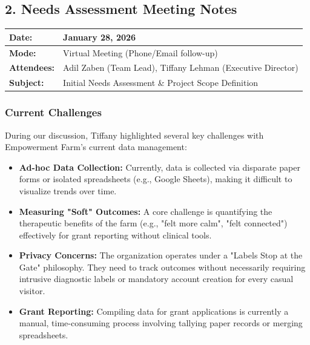 \documentclass[11pt]{article}
\begin{document}
\subsection*{2. Needs Assessment Meeting Notes}

\begin{tabular}{|l|p{10cm}|}
    \hline
    \textbf{Date:} & January 28, 2026 \\ \hline
    \textbf{Mode:} & Virtual Meeting (Phone/Email follow-up) \\ \hline
    \textbf{Attendees:} & Adil Zaben (Team Lead), Tiffany Lehman (Executive Director) \\ \hline
    \textbf{Subject:} & Initial Needs Assessment \& Project Scope Definition \\ \hline
\end{tabular}

\vspace{0.5cm}

\subsubsection*{Current Challenges}
During our discussion, Tiffany highlighted several key challenges with Empowerment Farm's current data management:
\begin{itemize}
    \item \textbf{Ad-hoc Data Collection:} Currently, data is collected via disparate paper forms or isolated spreadsheets (e.g., Google Sheets), making it difficult to visualize trends over time.
    \item \textbf{Measuring "Soft" Outcomes:} A core challenge is quantifying the therapeutic benefits of the farm (e.g., "felt more calm", "felt connected") effectively for grant reporting without clinical tools.
    \item \textbf{Privacy Concerns:} The organization operates under a "Labels Stop at the Gate" philosophy. They need to track outcomes without necessarily requiring intrusive diagnostic labels or mandatory account creation for every casual visitor.
    \item \textbf{Grant Reporting:} Compiling data for grant applications is currently a manual, time-consuming process involving tallying paper records or merging spreadsheets.
\end{itemize}
\end{document}
